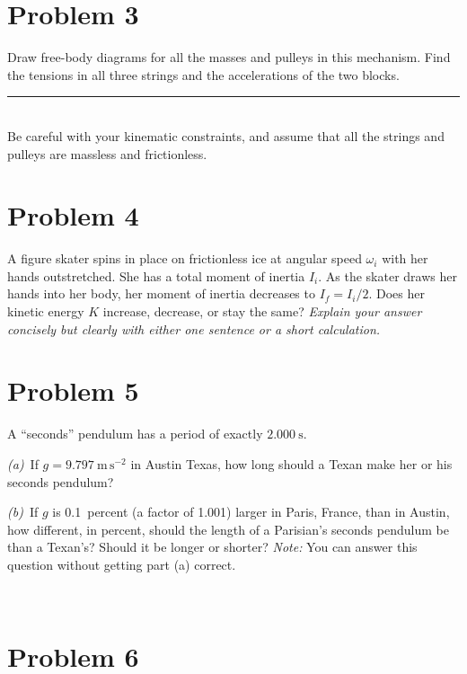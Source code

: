 \documentclass[12pt]{article}
\begin{document}
\clearpage

\section*{Problem 3}

Draw free-body diagrams for all the masses and pulleys in this
mechanism.  Find the tensions in all three strings and the
accelerations of the two blocks.
\\ \rule{0.35\textwidth}{0pt}
\\
Be careful with your kinematic constraints, and assume that all the
strings and pulleys are massless and frictionless.

\clearpage

\section*{Problem 4}

A figure skater spins in place on frictionless ice at angular speed
$\omega_i$ with her hands outstretched.  She has a total moment of
inertia $I_i$.  As the skater draws her hands into her body, her
moment of inertia decreases to $I_f=I_i/2$.  Does her kinetic energy
$K$ increase, decrease, or stay the same?  \emph{Explain your answer
concisely but clearly with either one sentence or a short
calculation.}

\clearpage

\section*{Problem 5}

A ``seconds'' pendulum has a period of exactly $2.000~\mathrm{s}$.

\textsl{(a)}~If $g=9.797~\mathrm{m\,s^{-2}}$ in Austin Texas, how long
should a Texan make her or his seconds pendulum?

\vfill

\textsl{(b)}~If $g$ is 0.1~percent (a factor of 1.001) larger in
Paris, France, than in Austin, how different, in percent, should the
length of a Parisian's seconds pendulum be than a Texan's?  Should it
be longer or shorter?  \emph{Note:} You can answer this question
without getting part (a) correct.

\vfill ~

\clearpage

\section*{Problem 6}
\end{document}
